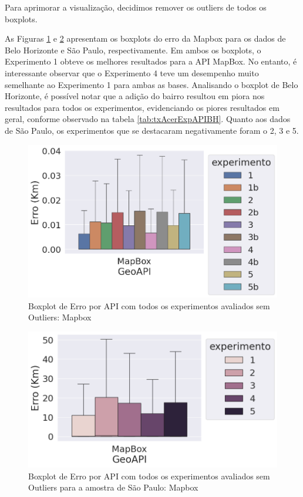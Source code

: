Para aprimorar a visualização, decidimos remover os outliers de todos os boxplots.

As Figuras \ref{fig:boxplot-api-mapbox-semout-bh} e \ref{fig:boxplot-api-mapbox-semout-sp} apresentam os boxplots do erro da Mapbox para os dados de Belo Horizonte e São Paulo, respectivamente. Em ambos os boxplots, o Experimento 1 obteve os melhores resultados para a API MapBox. No entanto, é interessante observar que o Experimento 4 teve um desempenho muito semelhante ao Experimento 1 para ambas as bases. Analisando o boxplot de Belo Horizonte, é possível notar que a adição do bairro resultou em piora nos resultados para todos os experimentos, evidenciando os piores resultados em geral, conforme observado na tabela \ref{tab:txAcerExpAPIBH}. Quanto aos dados de São Paulo, os experimentos que se destacaram negativamente foram o 2, 3 e 5.

\begin{figure}[h]
    \centering
    \includegraphics[width=\textwidth]{Figuras/boxplotApiMapboxSemOut.png}
    \caption{Boxplot de Erro por API com todos os experimentos avaliados sem Outliers: Mapbox}
    \label{fig:boxplot-api-mapbox-semout-bh}
\end{figure}

\begin{figure}[h]
  \centering
  \includegraphics[width=\textwidth]{Figuras/boxplotApiMapboxSemOutsp.png}
  \caption{Boxplot de Erro por API com todos os experimentos avaliados sem Outliers para a amostra de São Paulo: Mapbox}
  \label{fig:boxplot-api-mapbox-semout-sp}
\end{figure}


